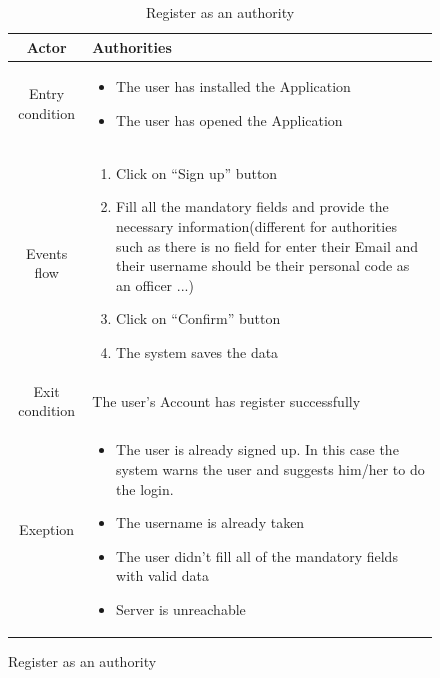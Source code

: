 \documentclass{article}
\begin{document}
	\begin{figure}
		\begin{table} [H]
		\begin{center}
		\caption{Register as an authority}
		\begin{tabular}{|c|p{8cm}|}
			\hline
			Actor			&	Authorities\\
			\hline
			Entry condition	&	\begin{itemize}[noitemsep,topsep=0pt]
									\item The user has installed the Application
									\item The user has opened the Application
								\end{itemize}\\
			\hline
			Events flow		&	\begin{enumerate}[noitemsep,topsep=0pt]
									\item Click on “Sign up” button
									\item Fill all the mandatory fields and provide the
									 necessary information(different for authorities such as
									  there is no field for enter their Email and their 
									  username should be their personal code as an officer ...)
									\item Click on “Confirm” button
									\item The system saves the data
								\end{enumerate}\\
			\hline
			Exit condition	&	The user's Account has register successfully\\
			\hline
			Exeption			& 	\begin{itemize}[noitemsep,topsep=0pt]
									\item The user is already signed up. In this case the
									 system warns the user and suggests him/her to do the
									  login.
									\item The username is already taken
									\item The user didn’t fill all of the mandatory 
									fields with valid data
									\item Server is unreachable
								\end{itemize}\\
			\hline
		\end{tabular}
		\end{center}
		\end{table} 
		

\end{figure}
\end{document}
